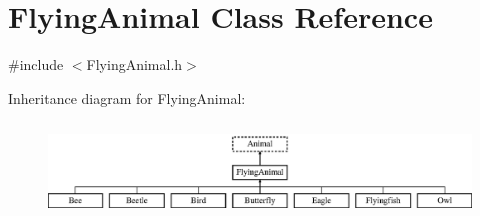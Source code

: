 \hypertarget{classFlyingAnimal}{\section{Flying\-Animal Class Reference}
\label{classFlyingAnimal}
}


{\ttfamily \#include $<$Flying\-Animal.\-h$>$}

Inheritance diagram for Flying\-Animal\-:\begin{figure}[H]
\begin{center}
\leavevmode
\includegraphics[height=2.580645cm]{classFlyingAnimal}
\end{center}
\end{figure}
